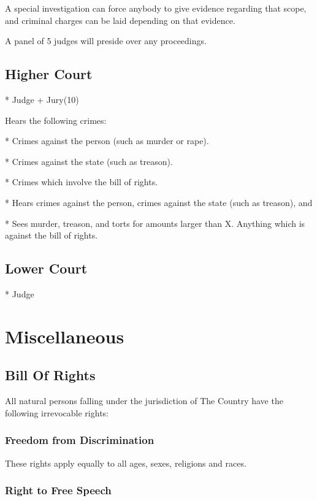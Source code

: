 \documentclass[a4paper]{report}
\begin{document}
A special investigation can force anybody to give evidence regarding that scope, and criminal charges can be laid depending on that evidence.

A panel of 5 judges will preside over any proceedings.

\section{Higher Court}

* Judge + Jury(10)

Hears the following crimes:

* Crimes against the person (such as murder or rape).

* Crimes against the state (such as treason).

* Crimes which involve the bill of rights.

* Hears crimes against the person, crimes against the state (such as treason), and 

* Sees murder, treason, and torts for amounts larger than X. Anything which is against the bill of rights.

\section{Lower Court}

* Judge

\chapter{Miscellaneous}

\section{Bill Of Rights}

All natural persons falling under the jurisdiction of The Country have the 
following irrevocable rights:

\subsection{Freedom from Discrimination}

These rights apply equally to all ages, sexes, religions and races.

\subsection{Right to Free Speech}
\end{document}
